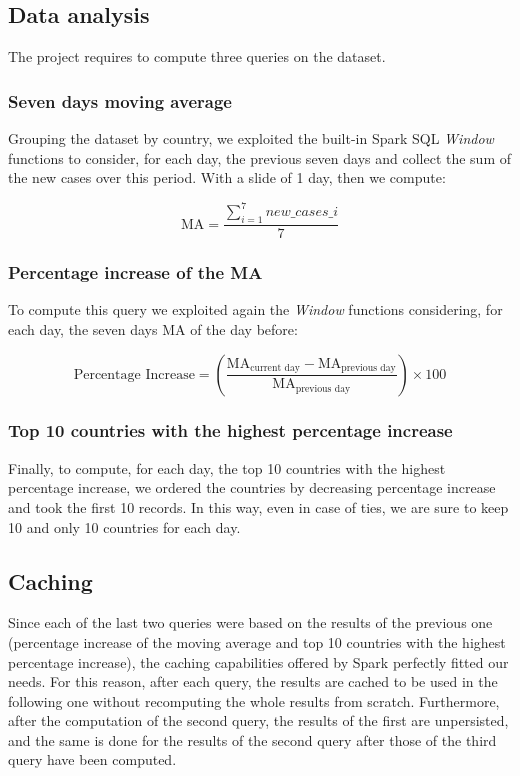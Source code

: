 \documentclass[11pt]{article}
\begin{document}
\subsection{Data analysis}
The project requires to compute three queries on the dataset.
\subsubsection{Seven days moving average}
Grouping the dataset by country, we exploited the built-in Spark SQL \textit{Window} functions to consider, for each day, the previous seven days and collect the sum of the new cases over this period. With a slide of 1 day, then we compute:

\begin{equation*}
    \text{MA} = \frac{{\sum_{i=1}^{7} new\_cases\_i}}{7}
\end{equation*}

\subsubsection{Percentage increase of the MA}
To compute this query we exploited again the \textit{Window} functions considering, for each day, the seven days MA of the day before:

\begin{equation*}
    \text{Percentage Increase} = \left( \frac{{\text{MA}_\text{current day} - \text{MA}_\text{previous day}}}{{\text{MA}_\text{previous day}}} \right) \times 100
\end{equation*}

\subsubsection{Top 10 countries with the highest percentage increase}
Finally, to compute, for each day, the top 10 countries with the highest percentage increase, we ordered the countries by decreasing percentage increase and took the first 10 records. In this way, even in case of ties, we are sure to keep 10 and only 10 countries for each day.

\subsection{Caching}
Since each of the last two queries were based on the results of the previous one (percentage increase of the moving average and top 10 countries with the highest percentage increase), the caching capabilities offered by Spark perfectly fitted our needs. For this reason, after each query, the results are cached to be used in the following one without recomputing the whole results from scratch. Furthermore, after the computation of the second query, the results of the first are unpersisted, and the same is done for the results of the second query after those of the third query have been computed.
\end{document}
